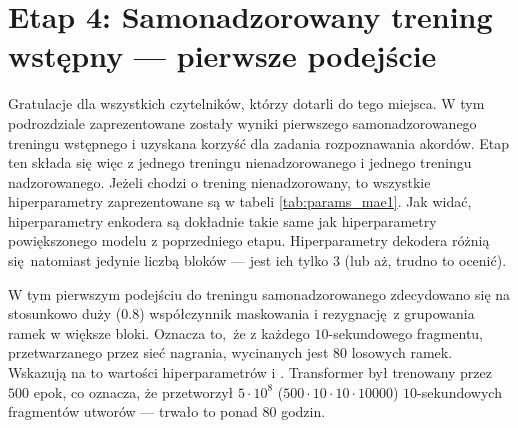 \section{Etap 4: Samonadzorowany trening wstępny --- pierwsze podejście}

Gratulacje dla wszystkich czytelników, którzy dotarli do tego miejsca. W tym podrozdziale zaprezentowane zostały wyniki pierwszego samonadzorowanego treningu wstępnego i uzyskana korzyść dla zadania rozpoznawania akordów. Etap ten składa się więc z jednego treningu nienadzorowanego i jednego treningu nadzorowanego. Jeżeli chodzi o trening nienadzorowany, to wszystkie hiperparametry zaprezentowane są w tabeli \ref{tab:params_mae1}. Jak widać, hiperparametry enkodera są dokładnie takie same jak hiperparametry powiększonego modelu z poprzedniego etapu. Hiperparametry dekodera różnią się natomiast jedynie liczbą bloków --- jest ich tylko $3$ (lub aż, trudno to ocenić). 

W tym pierwszym podejściu do treningu samonadzorowanego zdecydowano się na stosunkowo duży ($0.8$) współczynnik maskowania i rezygnację z grupowania ramek w większe bloki. Oznacza to, że z każdego $10$-sekundowego fragmentu, przetwarzanego przez sieć nagrania, wycinanych jest $80$ losowych ramek. Wskazują na to wartości hiperparametrów   i . Transformer był trenowany przez $500$ epok, co oznacza, że przetworzył $5 \cdot 10^8$ ($500 \cdot 10 \cdot 10 \cdot 10000$) $10$-sekundowych fragmentów utworów --- trwało to ponad $80$ godzin.

